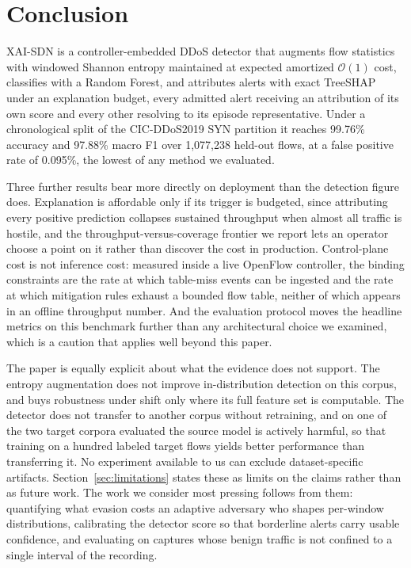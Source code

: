 \documentclass{ieeeaccess}
\begin{document}
\section{Conclusion}
\label{sec:conclusion}

XAI-SDN is a controller-embedded DDoS detector that augments flow statistics with
windowed Shannon entropy maintained at expected amortized $\mathcal{O}(1)$ cost,
classifies with a Random Forest, and attributes alerts with exact TreeSHAP under
an explanation budget, every admitted alert receiving an attribution of its own
score and every other resolving to its episode representative. Under
a chronological split of the CIC-DDoS2019 SYN partition it reaches 99.76\%
accuracy and 97.88\% macro F1 over 1,077,238 held-out flows, at a false positive
rate of 0.095\%, the lowest of any method we evaluated.

Three further results bear more directly on deployment than the detection
figure does. Explanation is affordable only
if its trigger is budgeted, since attributing every positive prediction collapses
sustained throughput when almost all traffic is hostile, and the
throughput-versus-coverage frontier we report lets an operator choose a point on
it rather than discover the cost in production. Control-plane cost is not
inference cost: measured inside a live OpenFlow controller, the binding
constraints are the rate at which table-miss events can be ingested and the rate
at which mitigation rules exhaust a bounded flow table, neither of which appears
in an offline throughput number. And the evaluation protocol moves the headline
metrics on this benchmark further than any architectural choice we examined,
which is a caution that applies well beyond this paper.

The paper is equally explicit about what the evidence does not support. The entropy
augmentation does not improve in-distribution detection on this corpus, and buys
robustness under shift only where its full feature set is computable. The
detector does not transfer to another corpus without retraining, and on one of the two target corpora evaluated the source model is actively
harmful, so that training on a hundred labeled target flows yields better
performance than transferring it. No experiment available to us can exclude dataset-specific
artifacts.
Section~\ref{sec:limitations} states these as limits on the claims rather than as
future work. The work we consider most pressing follows from them: quantifying
what evasion costs an adaptive adversary who shapes per-window distributions,
calibrating the detector score so that borderline alerts carry usable confidence,
and evaluating on captures whose benign traffic is not confined to a single
interval of the recording.
\end{document}
